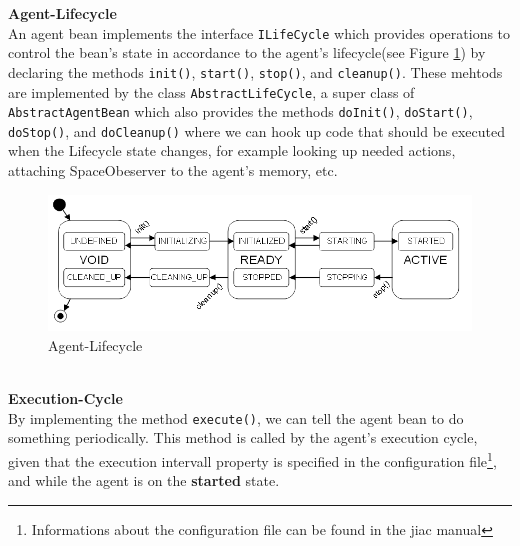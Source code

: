 \textbf{Agent-Lifecycle}\\
An agent bean implements the interface \texttt{ILifeCycle} which provides operations to control the bean's state in accordance to the agent's lifecycle(see Figure \ref{fig:lifecycle}) by declaring the methods \texttt{init()}, \texttt{start()}, \texttt{stop()}, and \texttt{cleanup()}. These mehtods are implemented by the class \texttt{AbstractLifeCycle}, a super class of \texttt{AbstractAgentBean} which also provides the methods \texttt{doInit()}, \texttt{doStart()}, \texttt{doStop()}, and \texttt{doCleanup()} where we can hook up code that should be executed when the Lifecycle state changes, for example looking up needed actions, attaching SpaceObeserver to the agent's memory, etc.
\begin{figure}
	\centering
		\includegraphics[width=1.00\textwidth]{images/lifecycle.png}
		\caption{Agent-Lifecycle \cite{JIACMAN10}}
		\label{fig:lifecycle}
\end{figure}\\

\textbf{Execution-Cycle}\\
By implementing the method \texttt{execute()}, we can tell the agent bean to do something periodically. This method is called by the agent's execution cycle, given that the execution intervall property is specified in the configuration file\footnote{Informations about the configuration file can be found in the jiac manual\cite{JIACMAN10}}, and while the agent is on the \textbf{started} state.\\

